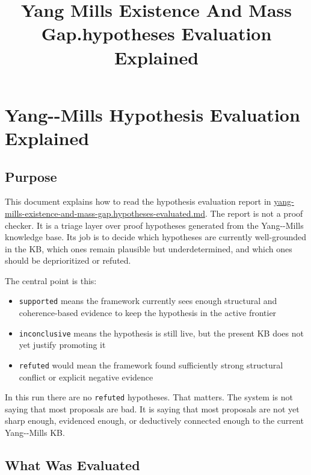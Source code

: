 \documentclass[
]{article}
\title{Yang Mills Existence And Mass Gap.hypotheses Evaluation
Explained}
\author{}
\date{}
\providecommand{\tightlist}{%
  \setlength{\itemsep}{0pt}\setlength{\parskip}{0pt}}
\begin{document}
\maketitle

\section{Yang-\/-Mills Hypothesis Evaluation
Explained}\label{yang--mills-hypothesis-evaluation-explained}

\subsection{Purpose}\label{purpose}

This document explains how to read the hypothesis evaluation report in
\href{/Users/user/files/abducer/abducer/phyp/yang-mills-existence-and-mass-gap.hypotheses-evaluated.md}{yang-mills-existence-and-mass-gap.hypotheses-evaluated.md}.
The report is not a proof checker. It is a triage layer over proof
hypotheses generated from the Yang-\/-Mills knowledge base. Its job is
to decide which hypotheses are currently well-grounded in the KB, which
ones remain plausible but underdetermined, and which ones should be
deprioritized or refuted.

The central point is this:

\begin{itemize}
\tightlist
\item
  \texttt{supported} means the framework currently sees enough
  structural and coherence-based evidence to keep the hypothesis in the
  active frontier
\item
  \texttt{inconclusive} means the hypothesis is still live, but the
  present KB does not yet justify promoting it
\item
  \texttt{refuted} would mean the framework found sufficiently strong
  structural conflict or explicit negative evidence
\end{itemize}

In this run there are no \texttt{refuted} hypotheses. That matters. The
system is not saying that most proposals are bad. It is saying that most
proposals are not yet sharp enough, evidenced enough, or deductively
connected enough to the current Yang-\/-Mills KB.

\subsection{What Was Evaluated}\label{what-was-evaluated}
\end{document}
